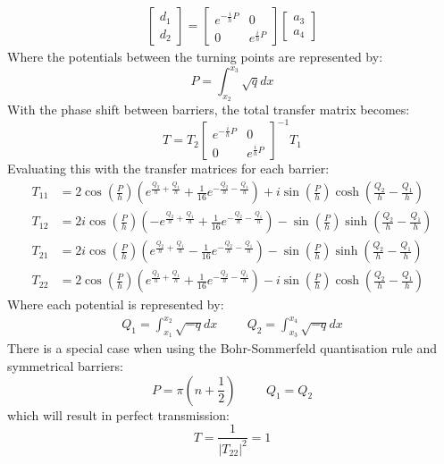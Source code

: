 		\begin{align}
			\left[\begin{array}{cc}
				d_{1}\\
				d_{2}
			\end{array}\right]
			=
			\left[\begin{array}{cc}
				e^{-\frac{i}{h}P} & 0\\
				0 & e^{\frac{i}{h}P}
			\end{array}\right]
			\left[\begin{array}{cc}
				a_{3}\\
				a_{4}
			\end{array}\right]
		\end{align}
		Where the potentials between the turning points are represented by:
		\begin{equation}
			P=\int_{x_{2}}^{x_{3}}\sqrt{q}dx
		\end{equation}
		With the phase shift between barriers, the total transfer matrix becomes:
		\begin{equation}
			T=T_{2}
			\left[\begin{array}{cc}
				e^{-\frac{i}{h}P} & 0\\
				0 & e^{\frac{i}{h}P}
			\end{array}\right]^{-1}
			T_{1}
		\end{equation}
		Evaluating this with the transfer matrices for each barrier:
		\begin{align}
			T_{11}&=2\cos\left(\frac{P}{h}\right)\left(e^{\frac{Q_{2}}{h}+\frac{Q_{1}}{h}}+\frac{1}{16}e^{-\frac{Q_{2}}{h}-\frac{Q_{1}}{h}}\right)+i\sin\left(\frac{P}{h}\right)\cosh\left(\frac{Q_{2}}{h}-\frac{Q_{1}}{h}\right)\\
			T_{12}&=2i\cos\left(\frac{P}{h}\right)\left(-e^{\frac{Q_{2}}{h}+\frac{Q_{1}}{h}}+\frac{1}{16}e^{-\frac{Q_{2}}{h}-\frac{Q_{1}}{h}}\right)-\sin\left(\frac{P}{h}\right)\sinh\left(\frac{Q_{2}}{h}-\frac{Q_{1}}{h}\right)\\
			T_{21}&=2i\cos\left(\frac{P}{h}\right)\left(e^{\frac{Q_{2}}{h}+\frac{Q_{1}}{h}}-\frac{1}{16}e^{-\frac{Q_{2}}{h}-\frac{Q_{1}}{h}}\right)-\sin\left(\frac{P}{h}\right)\sinh\left(\frac{Q_{2}}{h}-\frac{Q_{1}}{h}\right)\\
			T_{22}&=2\cos\left(\frac{P}{h}\right)\left(e^{\frac{Q_{2}}{h}+\frac{Q_{1}}{h}}+\frac{1}{16}e^{-\frac{Q_{2}}{h}-\frac{Q_{1}}{h}}\right)-i\sin\left(\frac{P}{h}\right)\cosh\left(\frac{Q_{2}}{h}-\frac{Q_{1}}{h}\right)
		\end{align}
		Where each potential is represented by:
		\begin{align}
			Q_{1}=\int_{x_{1}}^{x_{2}}\sqrt{-q}dx
			\hspace{1cm}
			Q_{2}=\int_{x_{3}}^{x_{4}}\sqrt{-q}dx
		\end{align}
		There is a special case when using the Bohr-Sommerfeld quantisation rule and symmetrical barriers:
		\begin{equation}
			P=\pi\left(n+\frac{1}{2}\right)\hspace{1cm}Q_{1}=Q_{2}
		\end{equation}
		which will result in perfect transmission:
		\begin{equation}
			T=\frac{1}{|T_{22}|^{2}}=1
		\end{equation}
